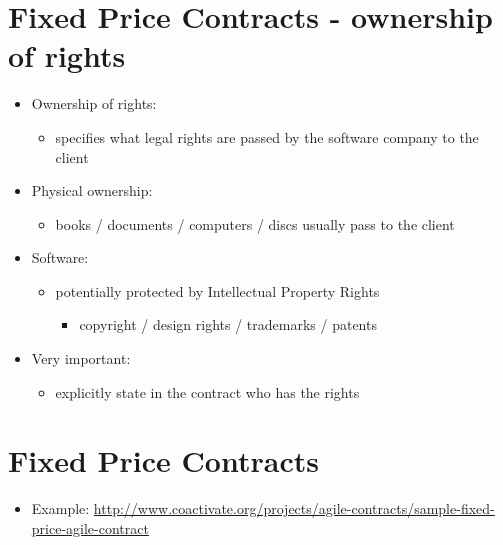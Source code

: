 \documentclass{article}
\begin{document}
\section{Fixed Price Contracts - ownership of rights}
\begin{itemize}
\item Ownership of rights:
\begin{itemize}
\item specifies what legal rights are passed by the software company to the client
\end{itemize}
\item Physical ownership:
\begin{itemize}
\item books / documents / computers / discs usually pass to the client
\end{itemize}
\item Software:
\begin{itemize}
\item potentially protected by Intellectual Property Rights
\begin{itemize}
\item copyright / design rights / trademarks / patents
\end{itemize}
\end{itemize}
\item Very important:
\begin{itemize}
\item explicitly state in the contract who has the rights
\end{itemize}
\end{itemize}



\section{Fixed Price Contracts}
\begin{itemize}
\item Example: \url{http://www.coactivate.org/projects/agile-contracts/sample-fixed-price-agile-contract}
\end{itemize}
\end{document}
